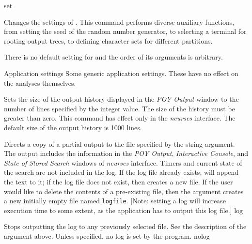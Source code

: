 \begin{command}{set}{}


\begin{poydescription}
Changes the settings of \poy. This command performs diverse auxiliary 
functions, from setting the seed of the random number generator, to
selecting a terminal for rooting output trees, to defining character sets
for different partitions.

There is no default setting for  and the order of its
arguments is arbitrary.

\end{poydescription}

\begin{arguments}

\begin{argumentgroup}{Application settings}
{Some generic application settings. These have no effect on the analyses
themselves.}

{Sets the size of the \poy output history displayed in the
\emph{POY Output} window to the number of lines specified by the
integer value. The size of the history must be greater than
zero. This command has effect only in the \emph{ncurses} interface. The
default size of the output history is 1000 lines.}
{}

{Directs a copy of a partial output to the file specified by the
string argument. The output includes the information in the
\emph{POY Output}, \emph{Interactive Console}, and \emph{State
of Stored Search} windows of \emph{ncurses} interface. Timers and
current state of the search are not included in the log. If the
log file already exists, \poy will append the text to it; if the log
file does not exist, then \poy creates a new file. If the user
would like to delete the contents of a pre-existing file, then
the argument  creates a new
initially empty file named \texttt{logfile}. [Note: setting a log will 
increase execution time to some extent, as the application has
to output this log file.]}
{log}

{Stops outputting the log to any previously selected
file. See the description of the argument 
above. Unless specified, no log is set by the program.}
{nolog}



\end{argumentgroup}
\end{arguments}
\end{command}
